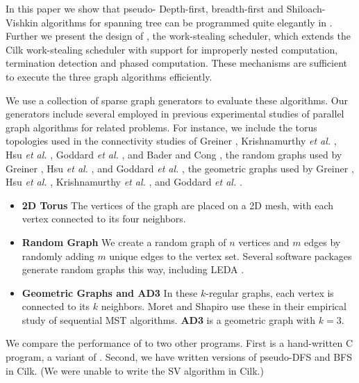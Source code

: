 In this paper we show that pseudo- Depth-first, breadth-first and
Shiloach-Vishkin algorithms for spanning tree can be programmed quite
elegantly in \Xten. Further we present the design of \XWS, the \Xten{}
work-stealing scheduler, which extends the Cilk work-stealing
scheduler with support for improperly nested computation, termination
detection and phased computation. These mechanisms are sufficient to
execute the three graph algorithms efficiently. 


We use a collection of sparse graph generators to evaluate these algorithms.
Our generators include several employed in previous
experimental studies of parallel graph algorithms for related
problems. For instance, we include the torus topologies used in the
connectivity studies of Greiner \cite{Gre94}, Krishnamurthy \emph{et
al.} \cite{KLC97}, Hsu \emph{et al.} \cite{HRD97}, Goddard \emph{et
al.} \cite{GKP97}, and Bader and Cong \cite{BC04b}, the random graphs
used by Greiner \cite{Gre94}, Hsu \emph{et al.}  \cite{HRD97}, and
Goddard \emph{et al.} \cite{GKP97}, the geometric graphs used by
Greiner \cite{Gre94}, Hsu \emph{et al.} \cite{HRD97}, Krishnamurthy
\emph{et al.} \cite{KLC97}, and Goddard \emph{et al.} \cite{GKP97}.

\begin{itemize}
\itemsep0pt

\item \textbf{2D Torus} The vertices of the graph are placed on a 2D
  mesh, with each vertex connected to its four neighbors.  

\item \textbf{Random Graph} We create a random graph of $n$ vertices
  and $m$ edges by randomly adding $m$ unique edges to the vertex
  set. Several software packages generate random graphs this way,
  including LEDA \cite{MN99}.
  
\item \textbf{Geometric Graphs and AD3} In these $k$-regular graphs,
  each vertex is connected to its $k$ %
  neighbors.  Moret and Shapiro \cite{MS94} use these
  in their empirical study of sequential MST algorithms. \textbf{AD3}
  is a geometric graph with $k=3$.  
\end{itemize}

We compare the performance of \XWS{} to two other programs. First is a
hand-written C program, a variant of \cite{BC04a}. Second, we have
written versions of pseudo-DFS and BFS in Cilk. (We were unable to
write the SV algorithm in Cilk.)

